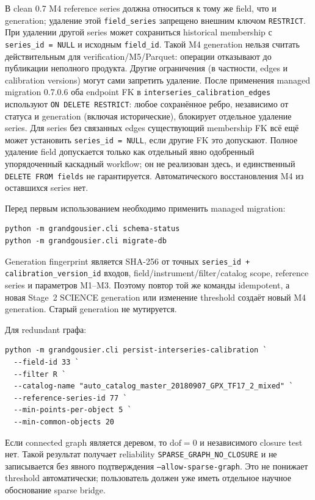 В clean 0.7 M4 reference series должна относиться к тому же field, что и generation;
удаление этой \texttt{field\_series} запрещено внешним ключом \texttt{RESTRICT}.
При удалении другой series может сохраниться historical membership с
\texttt{series\_id = NULL} и исходным \texttt{field\_id}. Такой M4 generation
нельзя считать действительным для verification/M5/Parquet: операции отказывают
до публикации неполного продукта. Другие ограничения (в частности, edges и
calibration versions) могут сами запретить удаление. После применения managed
migration 0.7.0.6 оба endpoint FK в \texttt{interseries\_calibration\_edges}
используют \texttt{ON DELETE RESTRICT}:
любое сохранённое ребро, независимо от статуса и generation (включая исторические),
блокирует отдельное удаление series. Для series без связанных edges существующий
membership FK всё ещё может установить \texttt{series\_id = NULL}, если другие FK
это допускают. Полное удаление field допускается только как отдельный явно одобренный
упорядоченный каскадный workflow; он не реализован здесь, и единственный
\texttt{DELETE FROM fields} не гарантируется. Автоматического восстановления M4 из
оставшихся series нет.

Перед первым использованием необходимо применить managed migration:

\begin{lstlisting}
python -m grandgousier.cli schema-status
python -m grandgousier.cli migrate-db
\end{lstlisting}

Generation fingerprint является SHA-256 от точных \texttt{series\_id + calibration\_version\_id} входов, field/instrument/filter/catalog scope, reference series и параметров M1--M3. Поэтому повтор той же команды idempotent, а новая Stage~2 SCIENCE generation или изменение threshold создаёт новый M4 generation. Старый generation не мутируется.

Для redundant графа:

\begin{lstlisting}
python -m grandgousier.cli persist-interseries-calibration `
  --field-id 33 `
  --filter R `
  --catalog-name "auto_catalog_master_20180907_GPX_TF17_2_mixed" `
  --reference-series-id 77 `
  --min-points-per-object 5 `
  --min-common-objects 20
\end{lstlisting}

Если connected graph является деревом, то $\mathrm{dof}=0$ и независимого closure test нет. Такой результат получает reliability \texttt{SPARSE\_GRAPH\_NO\_CLOSURE} и не записывается без явного подтверждения \texttt{--allow-sparse-graph}. Это не понижает threshold автоматически; пользователь должен уже иметь отдельное научное обоснование sparse bridge.

